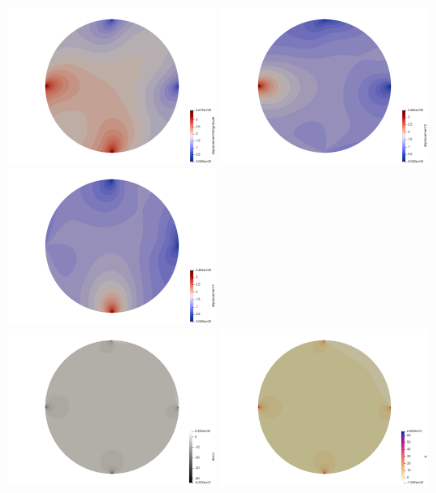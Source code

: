 \begin{center}
\includegraphics[width=5.5cm]{python_codes/fieldstone_58/experiment2/displ}
\includegraphics[width=5.5cm]{python_codes/fieldstone_58/experiment2/displx}
\includegraphics[width=5.5cm]{python_codes/fieldstone_58/experiment2/disply}\\
\includegraphics[width=5.5cm]{python_codes/fieldstone_58/experiment2/divv}
\includegraphics[width=5.5cm]{python_codes/fieldstone_58/experiment2/p}

\end{center}
